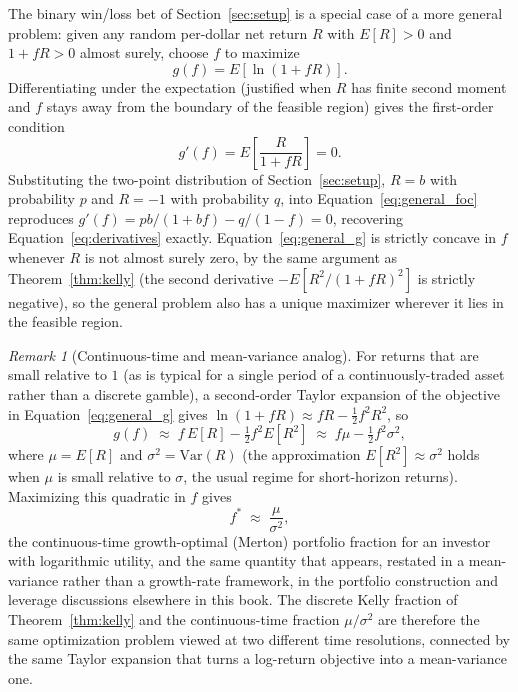 \documentclass[11pt]{article}
\theoremstyle{remark}
\newtheorem*{remark}{Remark}
\theoremstyle{definition}
\begin{document}
The binary win/loss bet of Section~\ref{sec:setup} is a special case of a more general problem: given any random per-dollar net return $R$ with $E[R]>0$ and $1+fR>0$ almost surely, choose $f$ to maximize
\begin{equation}
g(f) = E[\ln(1+fR)].
\label{eq:general_g}
\end{equation}
Differentiating under the expectation (justified when $R$ has finite second moment and $f$ stays away from the boundary of the feasible region) gives the first-order condition
\begin{equation}
g'(f) = E\!\left[\frac{R}{1+fR}\right] = 0.
\label{eq:general_foc}
\end{equation}
Substituting the two-point distribution of Section~\ref{sec:setup}, $R=b$ with probability $p$ and $R=-1$ with probability $q$, into Equation~\eqref{eq:general_foc} reproduces $g'(f) = pb/(1+bf) - q/(1-f) = 0$, recovering Equation~\eqref{eq:derivatives} exactly. Equation~\eqref{eq:general_g} is strictly concave in $f$ whenever $R$ is not almost surely zero, by the same argument as Theorem~\ref{thm:kelly} (the second derivative $-E[R^2/(1+fR)^2]$ is strictly negative), so the general problem also has a unique maximizer wherever it lies in the feasible region.

\begin{remark}[Continuous-time and mean-variance analog]
\label{rem:continuous}
For returns that are small relative to $1$ (as is typical for a single period of a continuously-traded asset rather than a discrete gamble), a second-order Taylor expansion of the objective in Equation~\eqref{eq:general_g} gives $\ln(1+fR) \approx fR - \tfrac{1}{2}f^2R^2$, so
\begin{equation}
g(f) \;\approx\; f\,E[R] - \tfrac{1}{2}f^2 E[R^2] \;\approx\; f\mu - \tfrac{1}{2}f^2\sigma^2,
\end{equation}
where $\mu=E[R]$ and $\sigma^2=\mathrm{Var}(R)$ (the approximation $E[R^2]\approx\sigma^2$ holds when $\mu$ is small relative to $\sigma$, the usual regime for short-horizon returns). Maximizing this quadratic in $f$ gives
\begin{equation}
f^{*} \;\approx\; \frac{\mu}{\sigma^2},
\end{equation}
the continuous-time growth-optimal (Merton) portfolio fraction for an investor with logarithmic utility, and the same quantity that appears, restated in a mean-variance rather than a growth-rate framework, in the portfolio construction and leverage discussions elsewhere in this book. The discrete Kelly fraction of Theorem~\ref{thm:kelly} and the continuous-time fraction $\mu/\sigma^2$ are therefore the same optimization problem viewed at two different time resolutions, connected by the same Taylor expansion that turns a log-return objective into a mean-variance one.
\end{remark}
\end{document}
